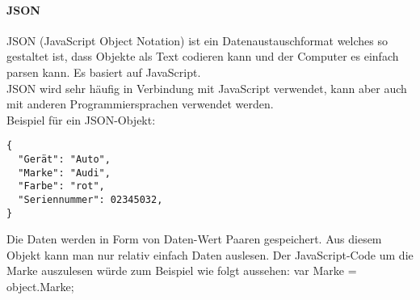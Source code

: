 \paragraph*{JSON}
JSON (JavaScript Object Notation) ist ein Datenaustauschformat welches so gestaltet ist, dass Objekte als Text codieren kann und der Computer es einfach parsen kann. Es basiert auf JavaScript.\\
JSON wird sehr häufig in Verbindung mit JavaScript verwendet, kann aber auch mit anderen Programmiersprachen verwendet werden.\\
Beispiel für ein JSON-Objekt:\\
\begin{lstlisting}
{
  "Gerät": "Auto",
  "Marke": "Audi",
  "Farbe": "rot",
  "Seriennummer": 02345032,
}
\end{lstlisting}

Die Daten werden in Form von Daten-Wert Paaren gespeichert. Aus diesem Objekt kann man nur relativ einfach Daten auslesen. Der JavaScript-Code um die Marke auszulesen würde zum Beispiel wie folgt aussehen:
var Marke = object.Marke;

